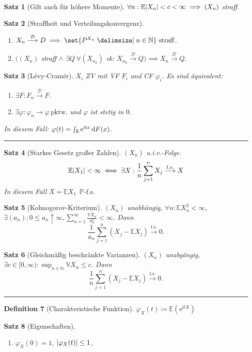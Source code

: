 \documentclass[a4paper,8pt]{article}
\newcounter{Sec}
\theoremstyle{nonumberbreak}
\newtheorem{definition}{Definition}[Sec]
\newtheorem{satz}[definition]{Satz}
\newcommand{\sep}{%
	\rule{\linewidth}{0.15pt}%
	\stepcounter{Sec}%
	}
\newcommand{\defas}{\coloneqq}
\renewcommand{\P}{\mathbb{P}}
\newcommand{\R}{\mathbb{R}}
\newcommand{\E}{\mathbb{E}}
\newcommand{\V}{\mathbb{V}}
\newcommand{\N}{\mathbb{N}}
\newcommand{\cf}{\varphi}
\newcommand{\e}{\mathrm{e}}
\renewcommand{\i}{\mathrm{i}}
\newcommand{\fsk}{\mathrel{\stackrel{\operatorname{f.s.}}{\longrightarrow}}}
\newcommand{\vk}{\mathrel{\stackrel{\mathcal{D}}{\longrightarrow}}}
\newcommand{\fs}[1]{~\operatorname{#1-f.s.}}
\begin{document}
\begin{multicols}{3}
\begin{satz}[Gilt auch für höhere Momente]
		$\forall n: \E \abs{X_n} < c < \infty \implies (X_n)$ straff.
	\end{satz}
	\begin{satz}[Straffheit und Verteilungskonvergenz]
		\begin{enumerate}[label=(\alph*)]
			\item $X_n\vk D\implies\set{P^{X_n}\given n\in\N}~\text{straff}$.
			\item $((X_n)$ straff $\land$ $\exists Q~\forall (X_{n_k})$ vk: $X_{n_k}\vk Q)\implies X_n\vk Q$.
		\end{enumerate}
	\end{satz}
	\begin{satz}[Lévy-Cramér]
		$X_i$ ZV mit VF $F_i$ und CF $\cf_i$. Es sind äquivalent:
		\begin{enumerate}[label=(\alph*)]
			\item $\exists F: F_n\vk F$.
			\item $\exists \cf: \cf_n\to\cf~\text{pktw.}$ und $\cf$ ist stetig in $0$.
		\end{enumerate}
		In diesem Fall: $\cf(t)=\smallint_\R\e^{\i tx}\dd{F(x)}$.
	\end{satz}
	\sep
	\begin{satz}[Starkes Gesetz großer Zahlen]
		$(X_n)$ u.i.v.-Folge.
		\[
			\E\abs{X_1}<\infty\iff
			\exists X:\frac{1}{n}\sum_{j=1}^nX_j\fsk X
		\]
		In diesem Fall $X=\E X_1 \fs{\P}$
	\end{satz}
	\begin{satz}[Kolmogorov-Kriterium]
		$(X_n)$ unabhängig, $\forall n:\E X_n^2<\infty$, $\exists (a_n): 0\le a_n\uparrow\infty, \displaystyle\sum_{n=1}^\infty \frac{\V X_n}{a_n^2}<\infty$.
		Dann
		\vspace{-1.5em}
		\[\frac{1}{a_n}\sum_{j=1}^n(X_j-\E X_j)\fsk 0.\]
	\end{satz}
	\begin{satz}[Gleichmäßig beschränkte Varianzen]
		$(X_n)$ unabgängig, $\exists c\in[0,\infty):\sup_{n\in\N}\V X_n\leq c$. Dann
		\[\frac{1}{n}\sum_{j=1}^n(X_j-\E X_j)\fsk 0.\]
	\end{satz}
	\sep
	\begin{definition}[Charakteristische Funktion]
		$
			\cf_X(t)\defas \E(\e^{\i tX})
		$
	\end{definition}
	\begin{satz}[Eigenschaften]
		{\setlength{\columnseprule}{0pt}\begin{multicols}{2}
		\begin{enumerate}[label=(\alph*)]
			\item $\cf_X(0)=1$, $\abs{\cf_X(t)}\leq 1$,

\end{enumerate}
\end{multicols}}
\end{satz}
\end{multicols}
\end{document}
